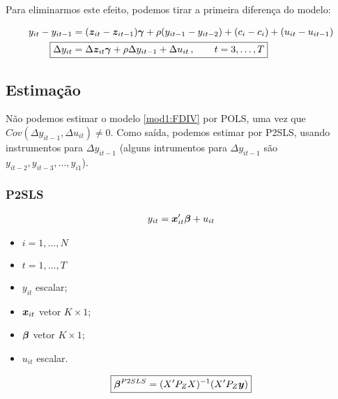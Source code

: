 \documentclass[11pt, oneside, a4paper, article]{article}
\numberwithin{equation}{section}
\begin{document}
\begin{description}
	Para eliminarmos este efeito, podemos tirar a primeira diferença do modelo:

	\vspace{-1 em}
	\begin{align}
		\nonumber
		y_{it} - y_{it-1} &= 
		(\mbs{z}_{it} - \mbs{z}_{it-1}) \mbs{\gamma} +
		\rho (y_{i t - 1} -  y_{i t - 2} ) +
		(c_{i} - c_{i}) + (u_{it} - u_{it-1})
		\\
		\label{mod1:FDIV}
		\Aboxed{
			\Delta y_{it} &= 
			\Delta \mbs{z}_{it} \mbs{\gamma} + \rho \Delta y_{i t - 1} + \Delta u_{it}
		\, , \qquad t=3, \dots, T}
	\end{align}

	\subsection{Estimação}

	Não podemos estimar o modelo \eqref{mod1:FDIV} por POLS, uma vez que $Cov(\Delta y_{it-1}, \Delta u_{it} ) \neq 0$.
	Como saída, podemos estimar por P2SLS, usando instrumentos para $\Delta y_{it-1}$ (alguns intrumentos para $\Delta y_{it-1}$ são $y_{it-2}, y_{it-3}, \dots, y_{i1}$).

	\subsubsection{P2SLS}

	\vspace{-1 em}
	\begin{align*}
		y_{it} = \boldsymbol{x}_{it}' \boldsymbol{\beta} + u_{it}
	\end{align*}

	\begin{itemize}\itemsep0pt
		\item $i = 1, \dots, N$
		\item $t = 1, \dots, T$
		\item $y_{it}$ escalar;
		\item $\boldsymbol{x}_{it}$  vetor $K \times 1$;
		\item $\boldsymbol{\beta}$ vetor $K \times 1$;
		\item $u_{it}$ escalar.
	\end{itemize}

	\vspace{-1 em}
	\begin{align*}
		\boxed{
		\boldsymbol{\beta}^{P2SLS} =  ( X' P_{Z} X )^{-1} ( X' P_{Z} \boldsymbol{y} ) }
	\end{align*}


\end{description}
\end{document}
